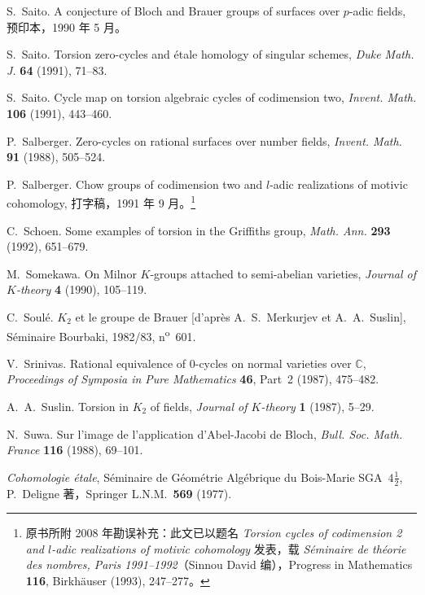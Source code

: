 \begin{description}[leftmargin=3.4em,labelsep=.5em,font=\normalfont]
\item[{[S2]}] S.~Saito. A conjecture of Bloch and Brauer groups of surfaces over $p$-adic fields, 预印本，1990 年 5 月。
\item[{[S3]}] S.~Saito. Torsion zero-cycles and étale homology of singular schemes, \textit{Duke Math. J.} \textbf{64} (1991), 71--83.
\item[{[S4]}] S.~Saito. Cycle map on torsion algebraic cycles of codimension two, \textit{Invent. Math.} \textbf{106} (1991), 443--460.
\item[{[Sb1]}] P.~Salberger. Zero-cycles on rational surfaces over number fields, \textit{Invent. Math.} \textbf{91} (1988), 505--524.
\item[{[Sb2]}] P.~Salberger. Chow groups of codimension two and $l$-adic realizations of motivic cohomology, 打字稿，1991 年 9 月。\footnote{原书所附 2008 年勘误补充：此文已以题名 \textit{Torsion cycles of codimension 2 and $l$-adic realizations of motivic cohomology} 发表，载 \textit{Séminaire de théorie des nombres, Paris 1991--1992}（Sinnou David 编），Progress in Mathematics \textbf{116}, Birkhäuser (1993), 247--277。}
\item[{[Sc]}] C.~Schoen. Some examples of torsion in the Griffiths group, \textit{Math. Ann.} \textbf{293} (1992), 651--679.
\item[{[So]}] M.~Somekawa. On Milnor $K$-groups attached to semi-abelian varieties, \textit{Journal of $K$-theory} \textbf{4} (1990), 105--119.
\item[{[S]}] C.~Soulé. $K_2$ et le groupe de Brauer [d'après A.~S.~Merkurjev et A.~A.~Suslin], Séminaire Bourbaki, 1982/83, n\textsuperscript{o}~601.
\end{description}

\begin{description}[leftmargin=3.4em,labelsep=.5em,font=\normalfont]
\item[{[Sr]}] V.~Srinivas. Rational equivalence of $0$-cycles on normal varieties over $\mathbb C$, \textit{Proceedings of Symposia in Pure Mathematics} \textbf{46}, Part~2 (1987), 475--482.
\item[{[Su]}] A.~A.~Suslin. Torsion in $K_2$ of fields, \textit{Journal of $K$-theory} \textbf{1} (1987), 5--29.
\item[{[Sw]}] N.~Suwa. Sur l'image de l'application d'Abel-Jacobi de Bloch, \textit{Bull. Soc. Math. France} \textbf{116} (1988), 69--101.
\item[{[SGA4 1/2]}] \textit{Cohomologie étale}, Séminaire de Géométrie Algébrique du Bois-Marie SGA~$4\frac12$, P.~Deligne 著，Springer L.N.M.~\textbf{569} (1977).
\end{description}
